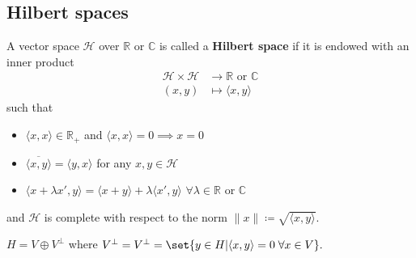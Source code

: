 \documentclass{article}
\newcommand{\1}[1]{\mathbbm{1}_{#1}}
\begin{document}
\subsection{Hilbert spaces}
A vector space $\mathcal{H}$ over $\mathbb{R}$ or $\mathbb{C}$ is called a \textbf{Hilbert space} if it is endowed with an inner product
\begin{align*}
    \mathcal{H} \times \mathcal{H} &\longrightarrow \mathbb{R} \text{ or } \mathbb{C} \\
    (x,y) &\longmapsto \langle x,y\rangle
\end{align*}
such that
\begin{itemize}
    \item $\langle x,x\rangle \in \mathbb{R}_+$ and $\langle x,x\rangle = 0 \implies x=0$
    \item $\overline{\langle x,y\rangle} = \langle y,x \rangle$ for any $x,y \in \mathcal{H}$
    \item $\langle x + \lambda x',y \rangle = \langle x+ y \rangle + \lambda \langle x',y\rangle$ $\forall \lambda \in \mathbb{R}$ or $\mathbb{C}$
\end{itemize}
and $\mathcal{H}$ is complete with respect to the norm $\|x\|\coloneqq \sqrt{\langle x,y\rangle}$.

\clearpage
\begin{cor}
    $H = V \oplus V^\bot$ where $V^\bot = V^\bot = \set{y \in H| \langle x, y\rangle = 0 \; \forall x \in V}.$
\end{cor}
\end{document}
